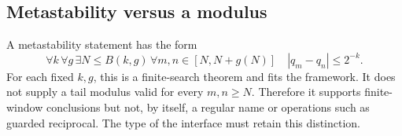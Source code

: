 \subsection{Metastability versus a modulus}

A metastability statement has the form
\[
  \forall k\,\forall g\,\exists N\le B(k,g)\,
  \forall m,n\in[N,N+g(N)]\quad |q_m-q_n|\le2^{-k}.
\]
For each fixed \(k,g\), this is a finite-search theorem and fits the framework.
It does not supply a tail modulus valid for every \(m,n\ge N\).  Therefore it
supports finite-window conclusions but not, by itself, a regular name or
operations such as guarded reciprocal.  The type of the interface must retain
this distinction.
